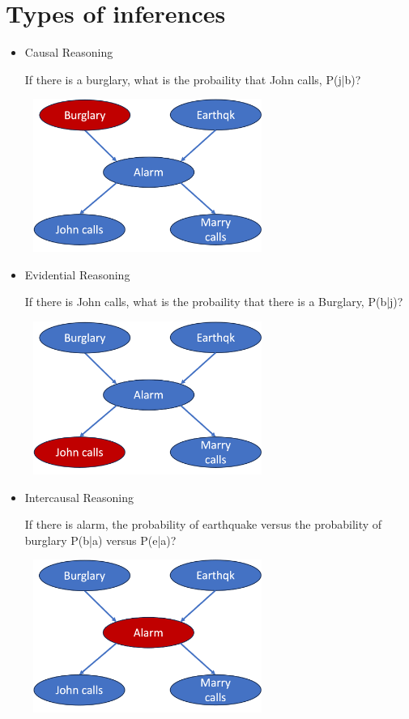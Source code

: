 \documentclass[11pt,a4paper]{report}
\begin{document}
\section{Types of inferences}
    \begin{itemize}
        \item Causal Reasoning
        
        If there is a burglary, what is the probaility that John calls, P(j|b)?

        \includegraphics[width = 8cm, height = 5cm]{causal_reasoning.png}

        \item Evidential Reasoning
        
        If there is John calls, what is the probaility that there is a Burglary, P(b|j)?

        \includegraphics[width = 8cm, height = 5cm]{evidential_reasoning.png}

        \item Intercausal Reasoning
        
        If there is alarm, the probability of earthquake versus the probability of burglary P(b|a) versus P(e|a)?

        \includegraphics[width = 8cm, height = 5cm]{intercausal_reasoning.png}


\end{itemize}
\end{document}

